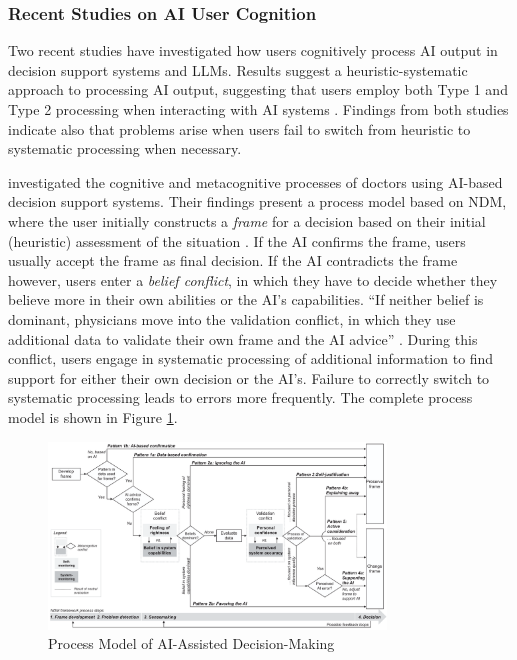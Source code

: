 \subsubsection{Recent Studies on AI User Cognition} \label{sssec:studies_ai_cognition}

Two recent studies have investigated how users cognitively process AI output in decision support systems and \acp{LLM}. Results suggest a heuristic-systematic approach to processing AI output, suggesting that users employ both Type 1 and Type 2 processing when interacting with AI systems \parencite{Jussupow2021,Kazemitabaar2024}. Findings from both studies indicate also that problems arise when users fail to switch from heuristic to systematic processing when necessary.

\cite{Jussupow2021} investigated the cognitive and metacognitive processes of doctors using \ac{AI}-based decision support systems. Their findings present a process model based on \ac{NDM}, where the user initially constructs a \textit{frame} for a decision based on their initial (heuristic) assessment of the situation \parencite{Klein2008, Klein2015}. If the \ac{AI} confirms the frame, users usually accept the frame as final decision. If the \ac{AI} contradicts the frame however, users enter a \textit{belief conflict}, in which they have to decide whether they believe more in their own abilities or the \ac{AI}'s capabilities. “If neither belief is dominant, physicians move into the validation conflict, in which they use additional data to validate their own frame and the AI advice” \parencite{Jussupow2021}. During this conflict, users engage in systematic processing of additional information to find support for either their own decision or the \ac{AI}'s. Failure to correctly switch to systematic processing leads to errors more frequently. The complete process model is shown in Figure \ref{fig:jussupow_process_model}.

\begin{figure}[ht]
    \centering
    \includegraphics[width=0.8\textwidth]{images/fig_jussupow_model.png}
    \caption[Process Model of AI-Assisted Decision-Making]{Process Model of AI-Assisted Decision-Making \parencite{Jussupow2021}}
    \label{fig:jussupow_process_model}
\end{figure}

